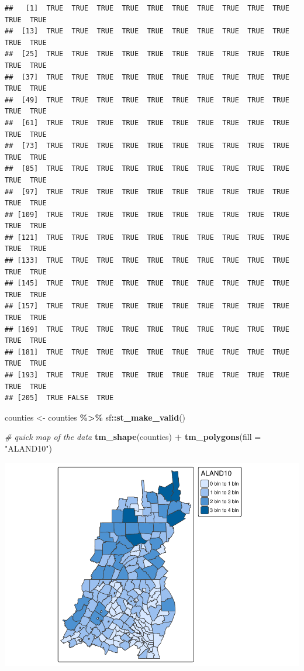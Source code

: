 \documentclass[]{article}
\newenvironment{Shaded}{\begin{snugshade}}{\end{snugshade}}
\newcommand{\AttributeTok}[1]{\textcolor[rgb]{0.13,0.29,0.53}{#1}}
\newcommand{\CommentTok}[1]{\textcolor[rgb]{0.56,0.35,0.01}{\textit{#1}}}
\newcommand{\FunctionTok}[1]{\textcolor[rgb]{0.13,0.29,0.53}{\textbf{#1}}}
\newcommand{\NormalTok}[1]{#1}
\newcommand{\OtherTok}[1]{\textcolor[rgb]{0.56,0.35,0.01}{#1}}
\newcommand{\SpecialCharTok}[1]{\textcolor[rgb]{0.81,0.36,0.00}{\textbf{#1}}}
\newcommand{\StringTok}[1]{\textcolor[rgb]{0.31,0.60,0.02}{#1}}
\begin{document}
\begin{verbatim}
##   [1]  TRUE  TRUE  TRUE  TRUE  TRUE  TRUE  TRUE  TRUE  TRUE  TRUE  TRUE  TRUE
##  [13]  TRUE  TRUE  TRUE  TRUE  TRUE  TRUE  TRUE  TRUE  TRUE  TRUE  TRUE  TRUE
##  [25]  TRUE  TRUE  TRUE  TRUE  TRUE  TRUE  TRUE  TRUE  TRUE  TRUE  TRUE  TRUE
##  [37]  TRUE  TRUE  TRUE  TRUE  TRUE  TRUE  TRUE  TRUE  TRUE  TRUE  TRUE  TRUE
##  [49]  TRUE  TRUE  TRUE  TRUE  TRUE  TRUE  TRUE  TRUE  TRUE  TRUE  TRUE  TRUE
##  [61]  TRUE  TRUE  TRUE  TRUE  TRUE  TRUE  TRUE  TRUE  TRUE  TRUE  TRUE  TRUE
##  [73]  TRUE  TRUE  TRUE  TRUE  TRUE  TRUE  TRUE  TRUE  TRUE  TRUE  TRUE  TRUE
##  [85]  TRUE  TRUE  TRUE  TRUE  TRUE  TRUE  TRUE  TRUE  TRUE  TRUE  TRUE  TRUE
##  [97]  TRUE  TRUE  TRUE  TRUE  TRUE  TRUE  TRUE  TRUE  TRUE  TRUE  TRUE  TRUE
## [109]  TRUE  TRUE  TRUE  TRUE  TRUE  TRUE  TRUE  TRUE  TRUE  TRUE  TRUE  TRUE
## [121]  TRUE  TRUE  TRUE  TRUE  TRUE  TRUE  TRUE  TRUE  TRUE  TRUE  TRUE  TRUE
## [133]  TRUE  TRUE  TRUE  TRUE  TRUE  TRUE  TRUE  TRUE  TRUE  TRUE  TRUE  TRUE
## [145]  TRUE  TRUE  TRUE  TRUE  TRUE  TRUE  TRUE  TRUE  TRUE  TRUE  TRUE  TRUE
## [157]  TRUE  TRUE  TRUE  TRUE  TRUE  TRUE  TRUE  TRUE  TRUE  TRUE  TRUE  TRUE
## [169]  TRUE  TRUE  TRUE  TRUE  TRUE  TRUE  TRUE  TRUE  TRUE  TRUE  TRUE  TRUE
## [181]  TRUE  TRUE  TRUE  TRUE  TRUE  TRUE  TRUE  TRUE  TRUE  TRUE  TRUE  TRUE
## [193]  TRUE  TRUE  TRUE  TRUE  TRUE  TRUE  TRUE  TRUE  TRUE  TRUE  TRUE  TRUE
## [205]  TRUE FALSE  TRUE
\end{verbatim}

\begin{Shaded}
\begin{Highlighting}[]
\NormalTok{counties }\OtherTok{\textless{}{-}}\NormalTok{ counties }\SpecialCharTok{\%\textgreater{}\%}\NormalTok{ sf}\SpecialCharTok{::}\FunctionTok{st\_make\_valid}\NormalTok{()}

\CommentTok{\# quick map of the data}
\FunctionTok{tm\_shape}\NormalTok{(counties) }\SpecialCharTok{+} \FunctionTok{tm\_polygons}\NormalTok{(}\AttributeTok{fill =} \StringTok{"ALAND10"}\NormalTok{)}
\end{Highlighting}
\end{Shaded}

\includegraphics{lab02_files/figure-latex/remembering tmap-1.pdf}
\end{document}
